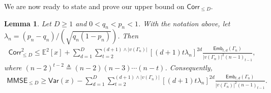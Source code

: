\documentclass[12pt]{article}
\newcommand{\bE}{\mathbb{E}}
\newtheorem{lemma}{Lemma}
\newcommand{\s}[1]{\mathsf{#1}}
\begin{document}
We are now ready to state and prove our upper bound on $\s{Corr}_{\leq D}$. 
\begin{lemma}\label{lem:LDPCorrUp}
Let $D\ge1$ and $0<q_n<p_n<1$. With the notation above, let $\lambda_n=(p_n-q_n)/(\sqrt{q_n(1-p_n)})$. Then
\begin{align}
\s{Corr}_{\le D}^2 \leq\bE^2[x]+\sum_{d=1}^D\sum_{t=2}^{(d+1)\wedge |v(\Gamma_n)|}[(d+1)t\lambda_n]^{2d}\frac{\s{Emb}_{t,d}(\Gamma_n)}{|v(\Gamma_n)|^2(n-1)_{t-1}},\label{eqn:CorrUpperBoundFinal}
\end{align}
where $(n-2)^{t-2}\triangleq(n-2)(n-3)\cdots(n-t)$.\label{eqn:MMSEUpperBoundFinal}
Consequently,
\begin{align}
\s{MMSE}_{\le D}\ge \s{Var}(x)-\sum_{d=1}^D\sum_{t=2}^{(d+1)\wedge |v(\Gamma_n)|}[(d+1)t\lambda_n]^{2d}\frac{\s{Emb}_{t,d}(\Gamma_n)}{|v(\Gamma_n)|^2(n-1)_{t-1}}.
\end{align}
\end{lemma}
\end{document}
